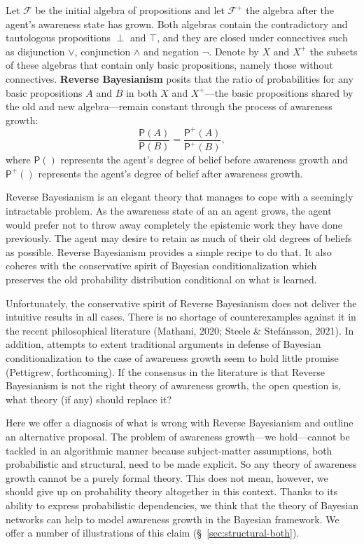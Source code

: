 \documentclass[
  11pt,
  dvipsnames,enabledeprecatedfontcommands]{scrartcl}
\newcommand{\pr}[1]{\ensuremath{\mathsf{P}(#1)}}
\newcommand{\ppr}[2]{\ensuremath{\mathsf{P}^{#1}(#2)}}
\begin{document}
Let \(\mathcal{F}\) be the initial algebra of propositions and let
\(\mathcal{F}^+\) the algebra after the agent's awareness state has
grown. Both algebras contain the contradictory and tautologous
propositions \(\perp\) and \(\top\), and they are closed under
connectives such as disjunction \(\vee\), conjunction \(\wedge\) and
negation \(\neg\). Denote by \(X\) and \(X^+\) the subsets of these
algebras that contain only basic propositions, namely those without
connectives. \textbf{Reverse Bayesianism} posits that the ratio of
probabilities for any basic propositions \(A\) and \(B\) in both \(X\)
and \(X^+\)---the basic propositions shared by the old and new
algebra---remain constant through the process of awareness growth:
\[\frac{\pr{A}}{\pr{B}} = \frac{\ppr{+}{A}}{\ppr{+}{B}},\] where
\(\pr{}\) represents the agent's degree of belief before awareness
growth and \(\ppr{+}{}\) represents the agent's degree of belief after
awareness growth.

Reverse Bayesianism is an elegant theory that manages to cope with a
seemingly intractable problem. As the awareness state of an an agent
grows, the agent would prefer not to throw away completely the epistemic
work they have done previously. The agent may desire to retain as much
of their old degrees of beliefs as possible. Reverse Bayesianism
provides a simple recipe to do that. It also coheres with the
conservative spirit of Bayesian conditionalization which preserves the
old probability distribution conditional on what is learned.

Unfortunately, the conservative spirit of Reverse Bayesianism does not
deliver the intuitive results in all cases. There is no shortage of
counterexamples against it in the recent philosophical literature
(Mathani, 2020; Steele \& Stefánsson, 2021). In addition, attempts to
extent traditional arguments in defense of Bayesian conditionalization
to the case of awareness growth seem to hold little promise (Pettigrew,
forthcoming). If the consensus in the literature is that Reverse
Bayesianism is not the right theory of awareness growth, the open
question is, what theory (if any) should replace it?

Here we offer a diagnosis of what is wrong with Reverse Bayesianism and
outline an alternative proposal. The problem of awareness growth---we
hold---cannot be tackled in an algorithmic manner because subject-matter
assumptions, both probabilistic and structural, need to be made
explicit. So any theory of awareness growth cannot be a purely formal
theory. This does not mean, however, we should give up on probability
theory altogether in this context. Thanks to its ability to express
probabilistic dependencies, we think that the theory of Bayesian
networks can help to model awareness growth in the Bayesian framework.
We offer a number of illustrations of this claim
(\S~\ref{sec:structural-both}).
\end{document}
